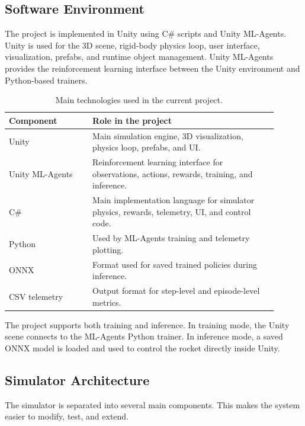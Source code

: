 \documentclass{article}
\begin{document}
\subsection{Software Environment}

The project is implemented in Unity using C\# scripts and Unity ML-Agents. Unity is used for the 3D scene, rigid-body physics loop, user interface, visualization, prefabs, and runtime object management. Unity ML-Agents provides the reinforcement learning interface between the Unity environment and Python-based trainers.

\begin{table}[h]
\centering
\begin{tabular}{p{0.28\linewidth} p{0.62\linewidth}}
\toprule
\textbf{Component} & \textbf{Role in the project} \\
\midrule
Unity & Main simulation engine, 3D visualization, physics loop, prefabs, and UI. \\
Unity ML-Agents & Reinforcement learning interface for observations, actions, rewards, training, and inference. \\
C\# & Main implementation language for simulator physics, rewards, telemetry, UI, and control code. \\
Python & Used by ML-Agents training and telemetry plotting. \\
ONNX & Format used for saved trained policies during inference. \\
CSV telemetry & Output format for step-level and episode-level metrics. \\
\bottomrule
\end{tabular}
\caption{Main technologies used in the current project.}
\end{table}

The project supports both training and inference. In training mode, the Unity scene connects to the ML-Agents Python trainer. In inference mode, a saved ONNX model is loaded and used to control the rocket directly inside Unity.

\subsection{Simulator Architecture}

The simulator is separated into several main components. This makes the system easier to modify, test, and extend.
\end{document}
